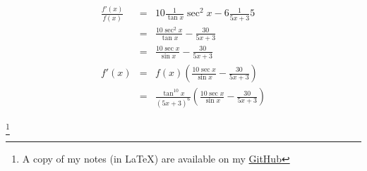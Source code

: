 \documentclass{article}
\newcommand\blfootnote[1]{
    \begingroup
    \renewcommand\thefootnote{}\footnote{#1}
    \addtocounter{footnote}{-1}
    \endgroup
}
\begin{document}
\begin{enumerate}
\begin{eqnarray}
            \frac{f'(x)}{f(x)} &=& 10\frac{1}{\tan{x}}\sec^2{x} - 6\frac{1}{5x + 3}5 \\
                               &=& \frac{10\sec^2{x}}{\tan{x}} - \frac{30}{5x + 3} \\
                               &=& \frac{10\sec{x}}{\sin{x}} - \frac{30}{5x + 3} \\
            f'(x) &=& f(x)\left(\frac{10\sec{x}}{\sin{x}} - \frac{30}{5x + 3}\right) \\
                  &=& \frac{\tan^{10}x}{\left(5x + 3\right)^6}\left(\frac{10\sec{x}}{\sin{x}} - \frac{30}{5x + 3}\right)
        \end{eqnarray}
\end{enumerate}

\blfootnote{A copy of my notes (in \LaTeX) are available on my \href{https://github.com/onlinechronically/MATH-211}{GitHub}}
\end{document}
